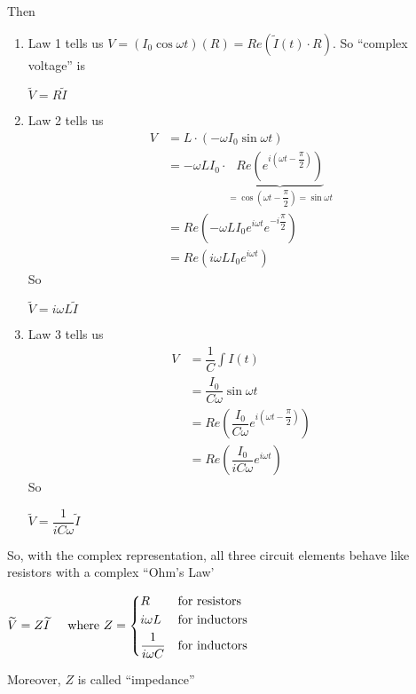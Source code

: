 \documentclass[12pt,titlepage]{article}
\begin{document}
Then \begin{enumerate}
	\item Law 1 tells us $V = (I_0\cos \omega t)(R) = Re(\widetilde{I}(t)\cdot R)$. So ``complex voltage'' is \begin{tcolorbox}[hbox, before=\par\smallskip\centering]
		$\tilde{V} = R\widetilde{I}$
	\end{tcolorbox}
	\item Law 2 tells us \begin{align*}
		V&= L\cdot (-\omega I_0\sin\omega t)\\
		&=-\omega LI_0\cdot \underbrace{Re(e^{i(\omega t - \dfrac{\pi}{2})})}_{= \cos(\omega t - \dfrac{\pi}{2}) = \sin \omega t}\\
		&=Re(-\omega L I_0 e^{i\omega t} e^{-i \dfrac{\pi}{2}})\\
		&=Re(i\omega LI_0e^{i\omega t})
	\end{align*}
	So \begin{tcolorbox}[hbox, before=\par\smallskip\centering]
		$\widetilde{V} = i\omega L\widetilde{I}$
	\end{tcolorbox}
	\item Law 3 tells us \begin{align*}
		V &= \dfrac{1}{C}\int I(t)\\
		&= \dfrac{I_0}{C\omega} \sin \omega t\\
		&=Re(\dfrac{I_0}{C\omega}e^{i(\omega t - \dfrac{\pi}{2})})\\
		&=Re(\dfrac{I_0}{iC\omega}e^{i\omega t})
	\end{align*}
	So \begin{tcolorbox}[hbox, before=\par\smallskip\centering]
		$\widetilde{V} = \dfrac{1}{iC\omega}\widetilde{I}$
	\end{tcolorbox}
\end{enumerate}
So, with the complex representation, all three circuit elements behave like resistors with a complex ``Ohm's Law'
\begin{tcolorbox}[hbox, before=\par\smallskip\centering]
	$\widetilde{V} = Z\widetilde{I} \;\;\;\;\text{ where } Z = \begin{dcases}
		R & \text{for resistors}\\
		i\omega L & \text{for inductors}\\
		\dfrac{1}{i\omega C} & \text{for inductors}
	\end{dcases}$
\end{tcolorbox}
Moreover, $Z$ is called ``impedance''
\end{document}
